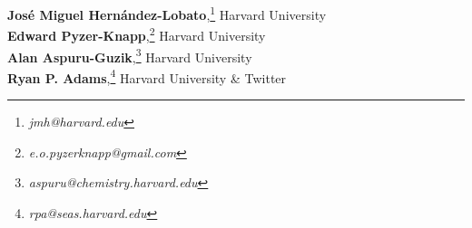 \textbf{Jos\'e Miguel Hern\'andez-Lobato},\footnote{\textit{jmh@harvard.edu}} {Harvard University}\\
\textbf{Edward Pyzer-Knapp},\footnote{\textit{e.o.pyzerknapp@gmail.com}} {Harvard University}\\
\textbf{Alan Aspuru-Guzik},\footnote{\textit{aspuru@chemistry.harvard.edu }} {Harvard University}\\
\textbf{Ryan P. Adams},\footnote{\textit{rpa@seas.harvard.edu}} {Harvard University} \& {Twitter}